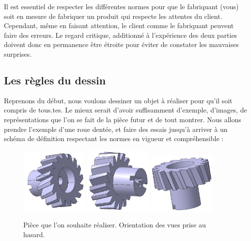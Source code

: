 \documentclass[
	11pt, %
	fleqn, %
	a4paper, %
]{LegrandOrangeBook}
\begin{document}
Il est essentiel de respecter les différentes normes pour que le fabriquant (vous) soit en mesure de fabriquer un produit qui respecte les attentes du client. Cependant, même en faisant attention, le client comme le fabriquant peuvent faire des erreurs. Le regard critique, additionné à l'expérience des deux parties doivent donc en permanence être étroite pour éviter de constater les mauvaises surprises. 

\subsection{Les règles du dessin}
Reprenons du début, nous voulons dessiner un objet à réaliser pour qu'il soit compris de tous.tes. Le mieux serait d'avoir suffisamment d'exemple, d'images, de représentations que l'on se fait de la pièce futur et de tout montrer. Nous allons prendre l'exemple d'une roue dentée, et faire des essais jusqu'à arriver à un schéma de définition respectant les normes en vigueur et compréhensible :
\begin{figure}[H] %
	\centering %
	\includegraphics[width=0.3\textwidth]{Images/R1.JPG} %
    \includegraphics[width=0.3\textwidth]{Images/R2.JPG} %
    \includegraphics[width=0.3\textwidth]{Images/R3.JPG} %
	\caption{Pièce que l'on souhaite réaliser. Orientation des vues prise au hasard.}
	\label{Roue1} %
\end{figure}
\end{document}
